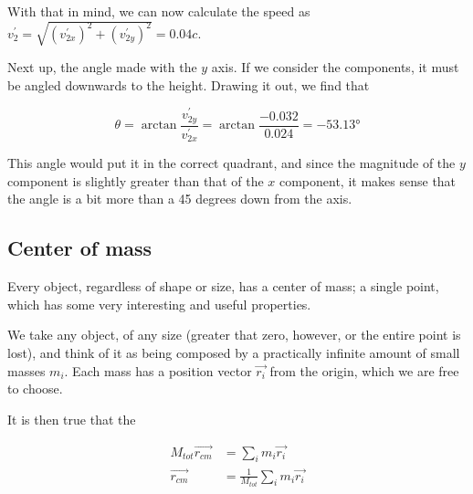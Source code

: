 With that in mind, we can now calculate the speed as $v_2^{'} = \sqrt{(v_{2x}^{'})^2 + (v_{2y}^{'})^2} = 0.04c$.

Next up, the angle made with the $y$ axis. If we consider the components, it must be angled downwards to the height. Drawing it out, we find that

\begin{equation}
\theta = \arctan \frac{v_{2y}^{'}}{v_{2x}^{'}} = \arctan \frac{-0.032}{0.024} = \ang{-53.13}
\end{equation}

This angle would put it in the correct quadrant, and since the magnitude of the $y$ component is slightly greater than that of the $x$ component, it makes sense that the angle is a bit more than a 45 degrees down from the axis.


\subsection{Center of mass}

Every object, regardless of shape or size, has a center of mass; a single point, which has some very interesting and useful properties.

We take any object, of any size (greater that zero, however, or the entire point is lost), and think of it as being composed by a practically infinite amount of small masses $m_i$. Each mass has a position vector $\vec{r_i}$ from the origin, which we are free to choose.

\begin{figure}[H]
  \centering
{}
\end{figure}


It is then true that the 

\begin{align}
M_{tot} \vec{r_{cm}} &= \sum_i m_i \vec{r_i}\\
\vec{r_{cm}} &= \frac{1}{M_{tot}} \sum_i m_i \vec{r_i}
\end{align}

